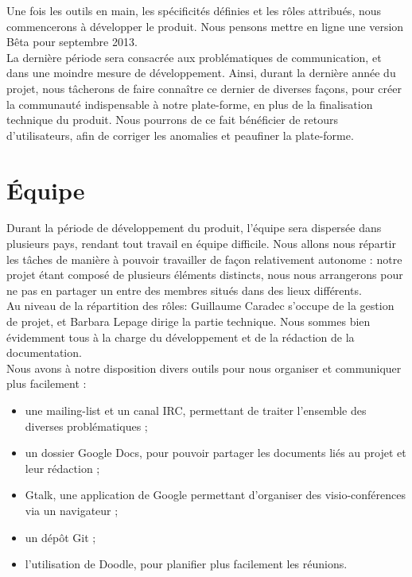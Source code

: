 \documentclass{life-fr}
\begin{document}
Une fois les outils en main, les spécificités définies et les rôles attribués, nous commencerons à développer le produit. Nous pensons mettre en ligne une version Bêta pour septembre 2013.\\

La dernière période sera consacrée aux problématiques de communication, et dans une moindre mesure de développement. Ainsi, durant la dernière année du projet, nous tâcherons de faire connaître ce dernier de diverses façons, pour créer la communauté indispensable à notre plate-forme, en plus de la finalisation technique du produit. Nous pourrons de ce fait bénéficier de retours d'utilisateurs, afin de corriger les anomalies et peaufiner la plate-forme.

\section{Équipe}

Durant la période de développement du produit, l'équipe sera dispersée dans plusieurs pays, rendant tout travail en équipe difficile. Nous allons nous répartir les tâches de manière à pouvoir travailler de façon relativement autonome : notre projet étant composé de plusieurs éléments distincts, nous nous arrangerons pour ne pas en partager un entre des membres situés dans des lieux différents.\\

Au niveau de la répartition des rôles: Guillaume Caradec s'occupe de la gestion de projet, et Barbara Lepage dirige la partie technique. Nous sommes bien évidemment tous à la charge du développement et de la rédaction de la documentation.\\

Nous avons à notre disposition divers outils pour nous organiser et communiquer plus facilement :\\

\begin{itemize}
  \item une mailing-list et un canal IRC, permettant de traiter l'ensemble des diverses problématiques ;
  \item un dossier Google Docs, pour pouvoir partager les documents liés au projet et leur rédaction ;
  \item Gtalk, une application de Google permettant d'organiser des visio-conférences via un navigateur ;
  \item un dépôt Git ;
  \item l'utilisation de Doodle, pour planifier plus facilement les réunions.
\end{itemize}
\end{document}
